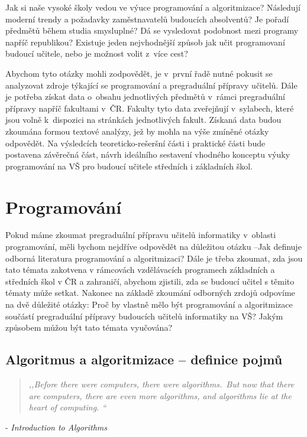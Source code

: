 \documentclass[FP,DP]{tulthesis}
\newcommand{\ahoj}[2]{\begin{quotation} \textit{#1} \end{quotation} \begin{flushright} - \textit{#2}\end{flushright} }
\begin{document}
Jak si naše vysoké školy vedou ve výuce programování a algoritmizace? Následují moderní trendy a požadavky zaměstnavatelů budoucích absolventů? Je pořadí předmětů během studia smysluplné? Dá se vysledovat podobnost mezi programy napříč republikou? Existuje  jeden nejvhodnější způsob jak učit programovaní budoucí učitele, nebo je možnost volit z~více cest?

 Abychom tyto otázky mohli zodpovědět, je v~první řadě nutné pokusit se analyzovat zdroje týkající se programování a pregraduální přípravy učitelů. Dále je potřeba získat data o~obsahu jednotlivých předmětů v~rámci pregraduální přípravy napříč fakultami v~ČR. Fakulty tyto data zveřejňují v~sylabech, které jsou volně k~dispozici na stránkách jednotlivých fakult. Získaná data budou zkoumána formou textové analýzy, jež by mohla na výše zmíněné otázky odpovědět. Na výsledcích teoreticko-rešeršní části i praktické části bude postavena závěrečná část, návrh ideálního sestavení vhodného konceptu výuky programování na VŠ pro budoucí učitele středních i základních škol.
\clearpage
\listoftodos
\chapter{Programování}
Pokud máme zkoumat pregraduální přípravu učitelů informatiky v~oblasti programování, měli bychom nejdříve odpovědět na důležitou otázku --Jak definuje odborná literatura programování a algoritmizaci? Dále je třeba zkoumat, zda jsou tato témata zakotvena v rámcovách vzdělávacích programech základních a středních škol v ČR a zahraničí, abychom zjistili, zda se budoucí učitel s těmito tématy může setkat. Nakonec na základě zkoumání odborných zrdojů odpovíme na dvě důležité otázky: Proč by vlastně mělo být programování a algoritmizace součástí pregraduální přípravy budoucích učitelů informatiky na VŠ? Jakým způsobem můžou být tato témata vyučována?
\section{Algoritmus a algoritmizace -- definice pojmů}
\ahoj{,,Before there were computers, there were algorithms.~But now that there are computers,
there are even more algorithms, and algorithms lie at the heart of computing. ``}{Introduction to Algorithms}
\end{document}
